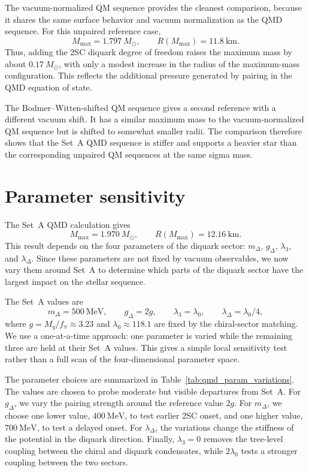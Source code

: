 The vacuum-normalized QM sequence provides the cleanest comparison,
because it shares the same surface behavior and vacuum normalization as
the QMD sequence. For this unpaired reference case,
\[
M_{\max}=1.797~M_\odot,
\qquad
R(M_{\max})=11.8~\mathrm{km}.
\]
Thus, adding the 2SC diquark degree of freedom raises the maximum mass
by about \(0.17~M_\odot\), with only a modest increase in the radius of
the maximum-mass configuration. This reflects the additional pressure
generated by pairing in the QMD equation of state.

The Bodmer--Witten-shifted QM sequence gives a second reference with a
different vacuum shift. It has a similar maximum mass to the
vacuum-normalized QM sequence but is shifted to somewhat smaller radii.
The comparison therefore shows that the Set~A QMD sequence is
stiffer and supports a heavier star than the corresponding unpaired
QM sequences at the same sigma mass.

\section{Parameter sensitivity}
\label{sec:qmd_parameter_sensitivity}

The Set~A QMD calculation gives
\begin{equation}
M_{\max}=1.970~M_\odot,
\qquad
R(M_{\max})=12.16~\mathrm{km}.
\end{equation}
This result depends on the four parameters of the diquark sector:
\(m_\Delta\), \(g_\Delta\), \(\lambda_3\), and
\(\lambda_\Delta\). Since these parameters are not fixed by vacuum
observables, we now vary them around Set~A to determine which parts
of the diquark sector have the largest impact on the stellar sequence.

The Set~A values are
\begin{equation}
m_\Delta = 500~\mathrm{MeV},
\qquad
g_\Delta = 2g,
\qquad
\lambda_3 = \lambda_0,
\qquad
\lambda_\Delta = \lambda_0/4,
\end{equation}
where \(g = M_q/f_\pi \approx 3.23\) and
\(\lambda_0 \approx 118.1\) are fixed by the chiral-sector matching.
We use a one-at-a-time approach: one parameter is varied while the
remaining three are held at their Set~A values. This gives a simple
local sensitivity test rather than a full scan of the four-dimensional
parameter space.

The parameter choices are summarized in
Table~\ref{tab:qmd_param_variations}. The values are chosen to probe
moderate but visible departures from Set~A. For \(g_\Delta\), we
vary the pairing strength around the reference value \(2g\). For
\(m_\Delta\), we choose one lower value, \(400~\mathrm{MeV}\), to test
earlier 2SC onset, and one higher value, \(700~\mathrm{MeV}\), to test a
delayed onset. For \(\lambda_\Delta\), the variations change the
stiffness of the potential in the diquark direction. Finally,
\(\lambda_3=0\) removes the tree-level coupling between the chiral and
diquark condensates, while \(2\lambda_0\) tests a stronger coupling
between the two sectors.

